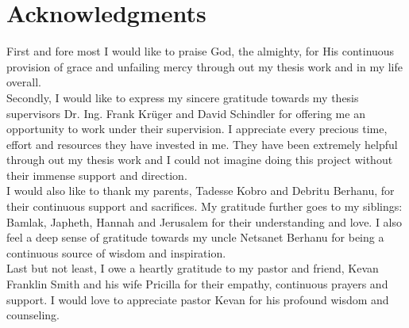 
\bigskip

\begingroup
\let\clearpage\relax
\let\cleardoublepage\relax
\let\cleardoublepage\relax
\chapter*{Acknowledgments}

First and fore most I would like to praise God, the almighty, for His continuous provision of grace and unfailing mercy through out my thesis work and in my life overall. \\

Secondly, I would like to express my sincere gratitude towards my thesis supervisors Dr. Ing. Frank Krüger and David Schindler for offering me an opportunity to work under their supervision. I appreciate every precious time, effort and resources they have invested in me. They have been extremely  helpful through out my thesis work and I could not imagine doing this project without their immense support and direction. \\

I would also like to thank my parents, Tadesse Kobro and Debritu Berhanu, for their continuous support and sacrifices. My gratitude further goes to my siblings: Bamlak, Japheth, Hannah and Jerusalem for their understanding and love.   I also feel a deep sense of gratitude towards my uncle Netsanet Berhanu for being a continuous source of wisdom and inspiration. \\

Last but not least, I owe a heartly gratitude to my pastor and friend, Kevan Franklin Smith and his wife Pricilla for their empathy, continuous prayers and support.  I would love to appreciate pastor Kevan for his profound wisdom and counseling. 



\bigskip


\endgroup



